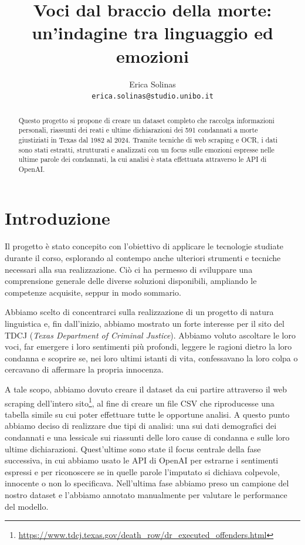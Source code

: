 \documentclass[11pt]{article}
\title{Voci dal braccio della morte: un'indagine tra linguaggio ed emozioni}
\author{Erica Solinas \\
  {\tt erica.solinas@studio.unibo.it} 
}
\date{}
\begin{document}
\maketitle
\begin{abstract}
  Questo progetto si propone di creare un dataset completo che raccolga informazioni personali, riassunti dei reati e ultime dichiarazioni dei 591 condannati a morte giustiziati in Texas dal 1982 al 2024. Tramite tecniche di web scraping e OCR, i dati sono stati estratti, strutturati e analizzati con un focus sulle emozioni espresse nelle ultime parole dei condannati, la cui analisi è stata effettuata attraverso le API di OpenAI.

\end{abstract}

\section{Introduzione}

Il progetto è stato concepito con l’obiettivo di applicare le tecnologie studiate durante il corso, esplorando al contempo anche ulteriori strumenti e tecniche necessari alla sua realizzazione. Ciò ci ha permesso di sviluppare una comprensione generale delle diverse soluzioni disponibili, ampliando le competenze acquisite, seppur in modo sommario.

Abbiamo scelto di concentrarci sulla realizzazione di un progetto di natura linguistica e, fin dall'inizio, abbiamo mostrato un forte interesse per il sito del TDCJ (\textit{Texas Department of Criminal Justice}). Abbiamo voluto ascoltare le loro voci, far emergere i loro sentimenti più profondi, leggere le ragioni dietro la loro condanna e scoprire se, nei loro ultimi istanti di vita, confessavano la loro colpa o cercavano di affermare la propria innocenza. 

A tale scopo, abbiamo dovuto creare il dataset da cui partire attraverso il web scraping dell'intero sito\footnote{\url{https://www.tdcj.texas.gov/death_row/dr_executed_offenders.html}}, al fine di creare un file CSV che riproducesse una tabella simile su cui poter effettuare tutte le opportune analisi. A questo punto abbiamo deciso di realizzare due tipi di analisi: una sui dati demografici dei condannati e una lessicale sui riassunti delle loro cause di condanna e sulle loro ultime dichiarazioni. Quest'ultime sono state il focus centrale della fase successiva, in cui abbiamo usato le API di OpenAI per estrarne i sentimenti espressi e per riconoscere se in quelle parole l'imputato si dichiava colpevole, innocente o non lo specificava. Nell'ultima fase abbiamo preso un campione del nostro dataset e l'abbiamo annotato manualmente per valutare le performance del modello. 
\end{document}
